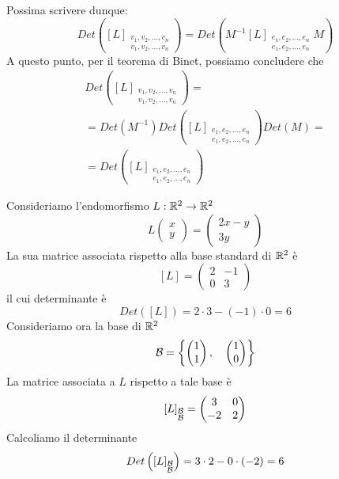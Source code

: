 Possima scrivere dunque:
\[
	Det \left(
	[L]_{\substack{
			v_1, v_2, \dots, v_n \\
			v_1, v_2, \dots, v_n
		}}
	\right) =
	Det \left(
	M^{-1}[L]_{\substack{
			e_1, e_2, \dots, e_n \\
			e_1, e_2, \dots, e_n
		}} M
	\right)
\]
A questo punto, per il teorema di Binet, possiamo concludere che
\begin{gather*}
	Det \left(
	[L]_{\substack{
			v_1, v_2, \dots, v_n \\
			v_1, v_2, \dots, v_n
		}}
	\right) = \\
	= Det(M^{-1}) Det \left(
	[L]_{\substack{
			e_1, e_2, \dots, e_n \\
			e_1, e_2, \dots, e_n
		}}
	\right) Det(M) = \\
	= Det \left(
	[L]_{\substack{
			e_1, e_2, \dots, e_n \\
			e_1, e_2, \dots, e_n
		}}
	\right)
\end{gather*}

\begin{example}
	Consideriamo l'endomorfismo $L : \mathbb{R}^2 \to \mathbb{R}^2$
	\[
		L \begin{pmatrix}
			x \\ y
		\end{pmatrix} =
		\begin{pmatrix}
			2x - y \\
			3y
		\end{pmatrix}
	\]
	La sua matrice associata rispetto alla base standard di $\mathbb{R}^2$ è
	\[
		[L] = \begin{pmatrix}
			2 & -1 \\
			0 & 3
		\end{pmatrix}
	\]
	il cui determinante è \[ Det([L]) = 2 \cdot 3 - (-1) \cdot 0 = 6 \]
	Consideriamo ora la base di $\mathbb{R}^2$
	\[
		\mathcal{B} =
		\left\{
		\begin{pmatrix} 1 \\ 1 \end{pmatrix}, \quad
		\begin{pmatrix} 1 \\ 0 \end{pmatrix}
		\right\}
	\]
	La matrice associata a $L$ rispetto a tale base è
	\[
		[L]_{\substack{\mathcal{B} \\ \mathcal{B}}} =
		\begin{pmatrix}
			3  & 0 \\
			-2 & 2
		\end{pmatrix}
	\]
	Calcoliamo il determinante
	\[
		Det \left( [L]_{\substack{\mathcal{B} \\ \mathcal{B}}} \right) =
		3 \cdot 2 - 0 \cdot (-2) = 6
	\]
\end{example}

